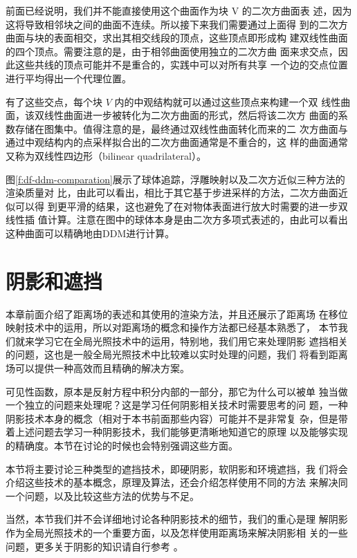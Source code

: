 前面已经说明，我们并不能直接使用这个曲面作为块 V 的二次方曲面表 述，因为这将导致相邻块之间的曲面不连续。所以接下来我们需要通过上面得 到的二次方曲面与块的表面相交，求出其相交线段的顶点，这些顶点即形成构 建双线性曲面的四个顶点。需要注意的是，由于相邻曲面使用独立的二次方曲 面来求交点，因此这些共线的顶点可能并不是重合的，实践中可以对所有共享 一个边的交点位置进行平均得出一个代理位置。

有了这些交点，每个块 $V$ 内的中观结构就可以通过这些顶点来构建一个双 线性曲面，该双线性曲面进一步被转化为二次方曲面的形式，然后将该二次方 曲面的系数存储在图集中。值得注意的是，最终通过双线性曲面转化而来的二 次方曲面与通过中观结构内的点采样拟合出的二次方曲面通常是不重合的，这 样的曲面通常又称为双线性四边形（bilinear quadrilateral）。

图\ref{f:df-ddm-comparation}展示了球体追踪，浮雕映射以及二次方近似三种方法的渲染质量对 比，由此可以看出，相比于其它基于步进采样的方法，二次方曲面近似可以得 到更平滑的结果，这也避免了在对物体表面进行放大时需要的进一步双线性插 值计算。注意在图中的球体本身是由二次方多项式表述的，由此可以看出这种曲面可以精确地由DDM进行计算。



\section{阴影和遮挡}


本章前面介绍了距离场的表述和其使用的渲染方法，并且还展示了距离场 在移位映射技术中的运用，所以对距离场的概念和操作方法都已经基本熟悉了， 本节我们就来学习它在全局光照技术中的运用，特别地，我们用它来处理阴影 遮挡相关的问题，这也是一般全局光照技术中比较难以实时处理的问题，我们 将看到距离场可以提供一种高效而且精确的解决方案。

可见性函数，原本是反射方程中积分内部的一部分，那它为什么可以被单 独当做一个独立的问题来处理呢？这是学习任何阴影相关技术时需要思考的问 题，一种阴影技术本身的概念（相对于本书前面那些内容）可能并不是非常复 杂，但是带着上述问题去学习一种阴影技术，我们能够更清晰地知道它的原理 以及能够实现的精确度。本节在讨论的时候也会特别强调这些方面。

本节将主要讨论三种类型的遮挡技术，即硬阴影，软阴影和环境遮挡，我 们将会介绍这些技术的基本概念，原理及算法，还会介绍怎样使用不同的方法 来解决同一个问题，以及比较这些方法的优势与不足。

当然，本节我们并不会详细地讨论各种阴影技术的细节，我们的重心是理 解阴影作为全局光照技术的一个重要方面，以及怎样使用距离场来解决阴影相 关的一些问题，更多关于阴影的知识请自行参考 \cite{b:rts}。




